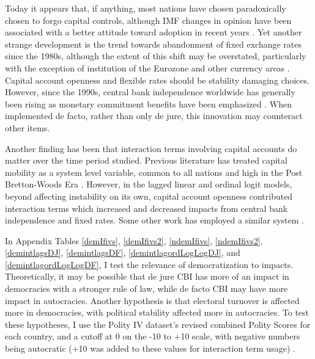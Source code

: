 \documentclass{article}
\begin{document}
    Today it appears that, if anything, most nations have chosen paradoxically chosen to forgo capital controls, although IMF changes in opinion have been associated with a better attitude toward adoption in recent years \citep{gallagher_capital_2010}. Yet another strange development is the trend towards abandonment of fixed exchange rates since the 1980s, although the extent of this shift may be overstated, particularly with the exception of institution of the Eurozone and other currency areas \citep{ilzetzki_exchange_2017}. Capital account openness and flexible rates should be stability damaging choices. However, since the 1990s, central bank independence worldwide has generally been rising as monetary commitment benefits have been emphasized \citep{jones_rethinking_2019}. When implemented de facto, rather than only de jure, this innovation may counteract other items.
    
    Another finding has been that interaction terms involving capital accounts do matter over the time period studied. Previous literature has treated capital mobility as a system level variable, common to all nations and high in the Post Bretton-Woods Era \citep{clark_monetary_2013}. However, in the lagged linear and ordinal logit models, beyond affecting instability on its own, capital account openness contributed interaction terms which increased and decreased impacts from central bank independence and fixed rates. Some other work has employed a similar system \citep{bernhard_political_2002-1}.

    In Appendix Tables \ref*{demIfivs}, \ref*{demIfivs2}, \ref*{ndemIfivs}, \ref*{ndemIfivs2}, \ref*{demintlagsDJ}, \ref{demintlagsDF}, \ref{demintlagordLogLogDJ}, and \ref{demintlagordLogLogDF}, I test the relevance of democratization to impacts. Theoretically, it may be possible that de jure CBI has more of an impact in democracies with a stronger rule of law, while de facto CBI may have more impact in autocracies. Another hypothesis is that electoral turnover is affected more in democracies, with political stability affected more in autocracies. To test these hypotheses, I use the Polity IV dataset’s revised combined Polity Scores for each country, and a cutoff at 0 on the -10 to +10 scale, with negative numbers being autocratic (+10 was added to these values for interaction term usage) \citep{polity_project_polity_2019}.
\end{document}
